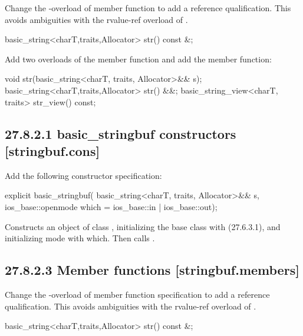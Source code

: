 \documentclass[ebook,11pt,article]{memoir}
\begin{document}
Change the -overload of  member function to add a reference qualification. This avoids ambiguities with the rvalue-ref overload of .  
\begin{codeblock}
basic_string<charT,traits,Allocator> str() const &;
\end{codeblock}


Add two overloads of the  member function and add the  member function:
\begin{codeblock}
void str(basic_string<charT, traits, Allocator>&& s);
basic_string<charT,traits,Allocator> str() &&;
basic_string_view<charT, traits> str_view() const;
\end{codeblock}


\subsection{27.8.2.1 basic\_stringbuf constructors [stringbuf.cons]}
Add the following constructor specification:
\begin{itemdecl}
      explicit basic_stringbuf(
        basic_string<charT, traits, Allocator>&& s,
        ios_base::openmode which = ios_base::in | ios_base::out);
\end{itemdecl}
\begin{itemdescr}
\pnum
\effects Constructs an object of class , initializing the base class with  (27.6.3.1), and initializing mode with which. Then calls .
\end{itemdescr}

\subsection{27.8.2.3 Member functions [stringbuf.members]}
Change the -overload of  member function specification to add a reference qualification. This avoids ambiguities with the rvalue-ref overload of .  
\begin{codeblock}
basic_string<charT,traits,Allocator> str() const &;
\end{codeblock}
\end{document}
